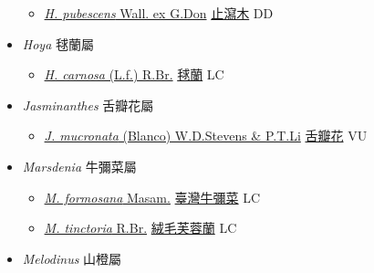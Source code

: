 \begin{itemize}
  \begin{itemize}
        \item[] \href{http://www.theplantlist.org/tpl1.1/search?q=Holarrhena+pubescens}{\textit{H. pubescens} Wall. ex G.Don}   \href{\detokenize{http://taibnet.sinica.edu.tw/chi/taibnet_species_list.php?T2=止瀉木&T2_new_value=true&fr=y}}{止瀉木} DD
  \end{itemize}
 \item[] \textit{Hoya} 毬蘭屬
                    
  \begin{itemize}
        \item[] \href{http://www.theplantlist.org/tpl1.1/search?q=Hoya+carnosa}{\textit{H. carnosa} (L.f.) R.Br.}   \href{\detokenize{http://taibnet.sinica.edu.tw/chi/taibnet_species_list.php?T2=毬蘭&T2_new_value=true&fr=y}}{毬蘭} LC
  \end{itemize}
 \item[] \textit{Jasminanthes} 舌瓣花屬
                    
  \begin{itemize}
        \item[] \href{http://www.theplantlist.org/tpl1.1/search?q=Jasminanthes+mucronata}{\textit{J. mucronata} (Blanco) W.D.Stevens \& P.T.Li}   \href{\detokenize{http://taibnet.sinica.edu.tw/chi/taibnet_species_list.php?T2=舌瓣花&T2_new_value=true&fr=y}}{舌瓣花} VU
  \end{itemize}
 \item[] \textit{Marsdenia} 牛彌菜屬
                    
  \begin{itemize}
        \item[] \href{http://www.theplantlist.org/tpl1.1/search?q=Marsdenia+formosana}{\textit{M. formosana} Masam.}   \href{\detokenize{http://taibnet.sinica.edu.tw/chi/taibnet_species_list.php?T2=臺灣牛彌菜&T2_new_value=true&fr=y}}{臺灣牛彌菜} LC
        \item[] \href{http://www.theplantlist.org/tpl1.1/search?q=Marsdenia+tinctoria}{\textit{M. tinctoria} R.Br.}   \href{\detokenize{http://taibnet.sinica.edu.tw/chi/taibnet_species_list.php?T2=絨毛芙蓉蘭&T2_new_value=true&fr=y}}{絨毛芙蓉蘭} LC
  \end{itemize}
 \item[] \textit{Melodinus} 山橙屬
                    

\end{itemize}
